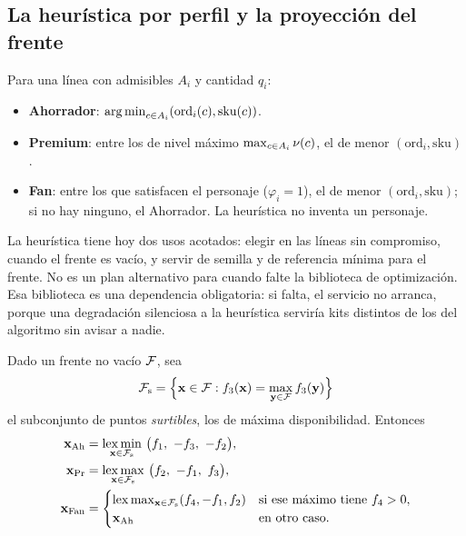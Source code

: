 \subsection{La heurística por perfil y la proyección del frente}
\label{sec:opt-proyeccion}

\begin{definicion}
\label{def:heuristica}
Para una línea con admisibles $A_i$ y cantidad $q_i$:
\begin{itemize}
  \item \textbf{Ahorrador}: $\operatorname*{arg\,min}_{c\in A_i}(\mathrm{ord}_i(c),\mathrm{sku}(c))$.
  \item \textbf{Premium}: entre los de nivel máximo $\max_{c\in A_i}\nu(c)$,
        el de menor $(\mathrm{ord}_i,\mathrm{sku})$.
  \item \textbf{Fan}: entre los que satisfacen el personaje ($\varphi_i=1$), el
        de menor $(\mathrm{ord}_i,\mathrm{sku})$; si no hay ninguno, el
        Ahorrador. La heurística no inventa un personaje.
\end{itemize}
\end{definicion}

La heurística tiene hoy dos usos acotados: elegir en las líneas sin
compromiso, cuando el frente es vacío, y servir de semilla y de referencia
mínima para el frente. No es un plan alternativo para cuando falte la
biblioteca de optimización. Esa biblioteca es una dependencia obligatoria: si
falta, el servicio no arranca, porque una degradación silenciosa a la
heurística serviría kits distintos de los del algoritmo sin avisar a nadie.

\begin{definicion}
\label{def:proyeccion}
Dado un frente no vacío $\mathcal{F}$, sea
\[
  \mathcal{F}_{\mathrm{s}}=\Bigl\{\mathbf{x}\in\mathcal{F} : f_3(\mathbf{x})=\max_{\mathbf{y}\in\mathcal{F}}f_3(\mathbf{y})\Bigr\}
\]
el subconjunto de puntos \emph{surtibles}, los de máxima disponibilidad. Entonces
\begin{align*}
  \mathbf{x}_{\mathrm{Ah}} &= \lexmin_{\mathbf{x}\in\Front_{\mathrm{s}}}\ \bigl(f_1,\ -f_3,\ -f_2\bigr),\\
  \mathbf{x}_{\mathrm{Pr}} &= \lexmax_{\mathbf{x}\in\Front_{\mathrm{s}}}\ \bigl(f_2,\ -f_1,\ f_3\bigr),\\
  \mathbf{x}_{\mathrm{Fan}} &= \begin{cases}\lexmax_{\mathbf{x}\in\Front_{\mathrm{s}}}(f_4,-f_1,f_2) & \text{si ese máximo tiene } f_4>0,\\
  \mathbf{x}_{\mathrm{Ah}} & \text{en otro caso.}\end{cases}
\end{align*}
\end{definicion}


